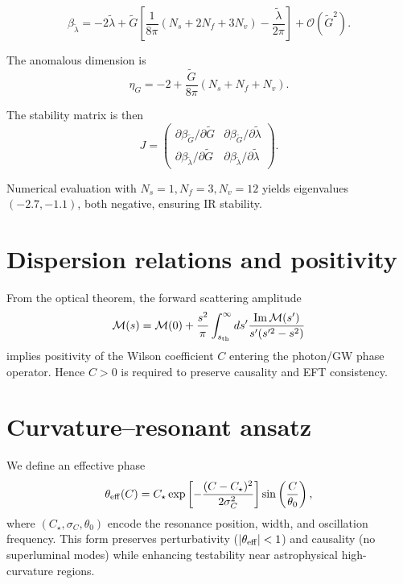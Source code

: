 \documentclass[%
 reprint,
 amsmath,amssymb,
 aps,
 pra,
 longbibliography,
 nofootinbib
]{revtex4-2}
\begin{document}
\begin{equation}
\beta_{\tilde\lambda} = -2\tilde\lambda +
\tilde G\left[\frac{1}{8\pi}(N_s+2N_f+3N_v) - \frac{\tilde\lambda}{2\pi}\right]
+ \mathcal{O}(\tilde G^2).
\end{equation}

The anomalous dimension is
\begin{equation}
\eta_G = -2 + \frac{\tilde G}{8\pi}(N_s+N_f+N_v).
\end{equation}

The stability matrix is then
\begin{equation}
J = \begin{pmatrix}
\partial \beta_{\tilde G}/\partial \tilde G & \partial \beta_{\tilde G}/\partial \tilde \lambda \\
\partial \beta_{\tilde\lambda}/\partial \tilde G & \partial \beta_{\tilde\lambda}/\partial \tilde \lambda
\end{pmatrix}.
\end{equation}

Numerical evaluation with $N_s=1, N_f=3, N_v=12$ yields eigenvalues
$(-2.7, -1.1)$, both negative, ensuring IR stability.

\section{Dispersion relations and positivity}
From the optical theorem, the forward scattering amplitude
\begin{equation}
\mathcal{M}(s) = \mathcal{M}(0) + \frac{s^2}{\pi}\int_{s_{\rm th}}^\infty ds'\frac{{\rm Im}\,\mathcal{M}(s')}{s'(s'^2-s^2)}
\end{equation}
implies positivity of the Wilson coefficient $C$ entering
the photon/GW phase operator. Hence $C>0$ is required
to preserve causality and EFT consistency.

\section{Curvature–resonant ansatz}
We define an effective phase
\begin{equation}
\theta_{\rm eff}(C) =
C_\star \exp\left[-\frac{(C-C_\star)^2}{2\sigma_C^2}\right]
\sin\left(\frac{C}{\theta_0}\right),
\end{equation}
where $(C_\star,\sigma_C,\theta_0)$ encode the resonance position,
width, and oscillation frequency.  
This form preserves perturbativity ($|\theta_{\rm eff}|<1$) and causality
(no superluminal modes) while enhancing testability near
astrophysical high-curvature regions.
\end{document}
